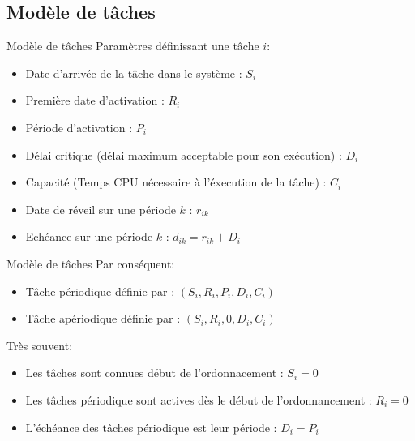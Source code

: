 \subsection{Modèle de tâches}

\begin{frame}{Modèle de tâches}
  Paramètres définissant une tâche $i$:
  \begin{itemize}
    \item Date d'arrivée de la tâche dans le système : $S_i$
    \item Première date d'activation : $R_i$
    \item Période d'activation : $P_i$
    \item Délai critique (délai maximum acceptable pour son exécution)
      : $D_i$
    \item Capacité (Temps CPU nécessaire à l'éxecution de la tâche) :
      $C_i$
    \item Date de réveil sur une période $k$ : $r_{ik}$
    \item Echéance sur une période $k$ : $d_{ik} = r_{ik} + D_i$
  \end{itemize}
\end{frame}

\begin{frame}{Modèle de tâches}
  Par conséquent: 
  \begin{itemize} 
  \item Tâche périodique définie par : $(S_i, R_i, P_i ,D_i, C_i)$
  \item Tâche apériodique définie par : $(S_i, R_i, 0, D_i, C_i)$
  \end{itemize} 
  Très souvent:
  \begin{itemize}
    \item Les tâches sont connues début de l'ordonnacement : $S_i = 0$
    \item Les tâches périodique sont actives dès le début de
      l'ordonnancement : $R_i = 0$
    \item L'échéance des  tâches périodique est leur période  : $D_i =
      P_i$
  \end{itemize}
\end{frame}

